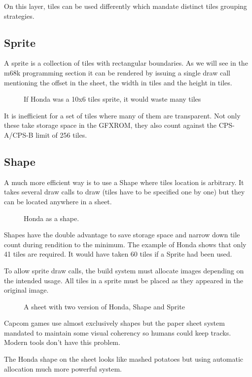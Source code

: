 On this layer, tiles can be used differently which mandate distinct tiles grouping strategies.

\subsection{Sprite}
A sprite is a collection of tiles with rectangular boundaries. As we will see in the m68k programming section it can be rendered by issuing a single draw call mentioning the offset in the sheet, the width in tiles and the height in tiles.

 \begin{figure}[H]
\caption*{If Honda was a 10x6 tiles sprite, it would waste many tiles}
\end{figure}

It is inefficient for a set of tiles where many of them are transparent. Not only these take storage space in the GFXROM, they also count against the CPS-A/CPS-B limit of 256 tiles.

\subsection{Shape}

A much more efficient way is to use a Shape where tiles location is arbitrary. It takes several draw calls to draw (tiles have to be specified one by one) but they can be located anywhere in a sheet.

 \begin{figure}[H]
\caption*{Honda as a shape.}
\end{figure}

Shapes have the double advantage to save storage space and narrow down tile count during rendition to the minimum. The example of Honda shows that only 41 tiles are required. It would have taken 60 tiles if a Sprite had been used.

To allow sprite draw calls, the build system must allocate images depending on the intended usage. All tiles in a sprite must be placed as they appeared in the original image.
 
\begin{figure}[H]
\caption*{A sheet with two version of Honda, Shape and Sprite}
\end{figure}


\begin{trivia}
Capcom games use almost exclusively shapes but the paper sheet system mandated to maintain some visual coherency so humans could keep tracks. Modern tools don't have this problem. 

The Honda shape on the sheet looks like mashed potatoes but using automatic allocation much more powerful system.
\end{trivia}


